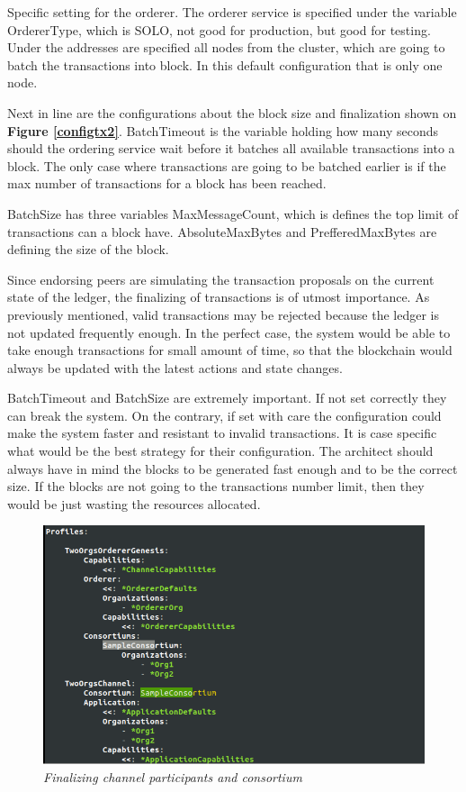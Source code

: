 \documentclass[a4paper,11pt]{report}
\begin{document}
Specific setting for the orderer. The orderer service is specified under the variable OrdererType, which is SOLO, not good for production, but good for testing. Under the addresses are specified all nodes from the cluster, which are going to batch the transactions into block. In this default configuration that is only one node.
 
Next in line are the configurations about the block size and finalization shown on \textbf{Figure \ref{configtx2}}. BatchTimeout is the variable holding how many seconds should the ordering service wait before it batches all available transactions into a block. The only case where transactions are going to be batched earlier is if the max number of transactions for a block has been reached.

	BatchSize has three variables MaxMessageCount, which is defines the top limit of transactions can a block have. AbsoluteMaxBytes and PrefferedMaxBytes are defining the size of the block.
	
	Since endorsing peers are simulating the transaction proposals on the current state of the ledger, the finalizing of transactions is of utmost importance. As previously mentioned, valid transactions may be rejected because the ledger is not updated frequently enough. In the perfect case, the system would be able to take enough transactions for small amount of time, so that the blockchain would always be updated with the latest actions and state changes. 
	
	BatchTimeout and BatchSize are extremely important. If not set correctly they can break the system. On the contrary, if set with care the configuration could make the system faster and resistant to invalid transactions. It is case specific what would be the best strategy for their configuration. The architect should always have in mind the blocks to be generated fast enough and to be the correct size. If the blocks are not going to the transactions number limit, then they would be just wasting the resources allocated.  


\begin{figure}[h]
\centering
  \includegraphics[width = 16cm]{configtx3.png}
  \caption{\textit{Finalizing channel participants and consortium}}
  \label{configtx3}
\end{figure}
\end{document}
